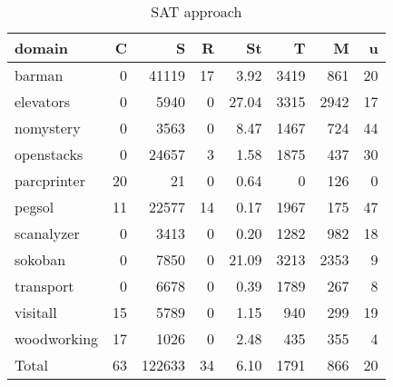 \begin{table}[htbp]
\centering
\begingroup\small
\begin{tabular}{lrrrrrrr}
  \hline
domain & C & S & R & St & T & M & u \\ 
  \hline
barman &   0 & 41119 &  17 & 3.92 & 3419 & 861 &  20 \\ 
  elevators &   0 & 5940 &   0 & 27.04 & 3315 & 2942 &  17 \\ 
  nomystery &   0 & 3563 &   0 & 8.47 & 1467 & 724 &  44 \\ 
  openstacks &   0 & 24657 &   3 & 1.58 & 1875 & 437 &  30 \\ 
  parcprinter &  20 &  21 &   0 & 0.64 &   0 & 126 &   0 \\ 
  pegsol &  11 & 22577 &  14 & 0.17 & 1967 & 175 &  47 \\ 
  scanalyzer &   0 & 3413 &   0 & 0.20 & 1282 & 982 &  18 \\ 
  sokoban &   0 & 7850 &   0 & 21.09 & 3213 & 2353 &   9 \\ 
  transport &   0 & 6678 &   0 & 0.39 & 1789 & 267 &   8 \\ 
  visitall &  15 & 5789 &   0 & 1.15 & 940 & 299 &  19 \\ 
  woodworking &  17 & 1026 &   0 & 2.48 & 435 & 355 &   4 \\ 
  Total &  63 & 122633 &  34 & 6.10 & 1791 & 866 &  20 \\ 
   \hline
\end{tabular}
\endgroup
\caption{SAT approach} 
\label{tab:sat}
\end{table}
